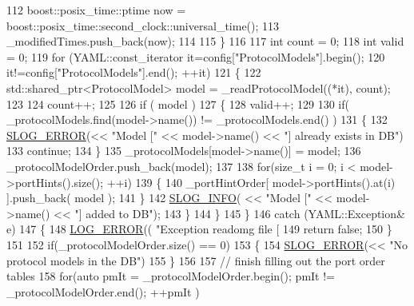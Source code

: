 \begin{DoxyCode}
{112             boost::posix\_time::ptime now = boost::posix\_time::second\_clock::universal\_time();
113             \_modifiedTimes.push\_back(now);
114 
115         \}
116 
117         \textcolor{keywordtype}{int} count = 0;
118         \textcolor{keywordtype}{int} valid = 0;
119         \textcolor{keywordflow}{for} (YAML::const\_iterator it=config[\textcolor{stringliteral}{"ProtocolModels"}].begin(); 
120                         it!=config[\textcolor{stringliteral}{"ProtocolModels"}].end(); ++it)
121         \{
122             std::shared\_ptr<ProtocolModel> model = \_readProtocolModel((*it), count);
123 
124             count++;
125 
126             \textcolor{keywordflow}{if} ( model )
127             \{
128                 valid++;
129                 
130                 \textcolor{keywordflow}{if}( \_protocolModels.find(model->name()) != \_protocolModels.end() )
131                 \{
132                     \hyperlink{_logger_8h_a2a8694cd392d18f4db6b9cc9f15bafe3}{SLOG\_ERROR}(<< \textcolor{stringliteral}{"Model ["} << model->name() << \textcolor{stringliteral}{"] already exists in DB"})
133                     \textcolor{keywordflow}{continue};
134                 \}
135                 \_protocolModels[model->name()] = model;
136                 \_protocolModelOrder.push\_back(model);
137 
138                 \textcolor{keywordflow}{for}(\textcolor{keywordtype}{size\_t} i = 0; i < model->portHints().size(); ++i)
139                 \{
140                     \_portHintOrder[ model->portHints().at(i) ].push\_back( model );
141                 \}
142                 \hyperlink{_logger_8h_a119c1c29ba35a8db38e2358e41167282}{SLOG\_INFO}( << \textcolor{stringliteral}{"Model ["} << model->name() << \textcolor{stringliteral}{"] added to DB"});
143             \}
144         \}
145     \}
146     \textcolor{keywordflow}{catch} (YAML::Exception& e)
147     \{
148         \hyperlink{_logger_8h_aa2ffef3c03ca18789b5d04ac9b260128}{LOG\_ERROR}(( \textcolor{stringliteral}{"Exception readomg file [%
149         \textcolor{keywordflow}{return} \textcolor{keyword}{false};
150     \}
151 
152     \textcolor{keywordflow}{if}(\_protocolModelOrder.size() == 0)
153     \{
154         \hyperlink{_logger_8h_a2a8694cd392d18f4db6b9cc9f15bafe3}{SLOG\_ERROR}(<< \textcolor{stringliteral}{"No protocol models in the DB"})
155     \}
156 
157     \textcolor{comment}{// finish filling out the port order tables}
158     \textcolor{keywordflow}{for}(\textcolor{keyword}{auto} pmIt = \_protocolModelOrder.begin(); pmIt != \_protocolModelOrder.end(); ++pmIt )
}}
\end{DoxyCode}

